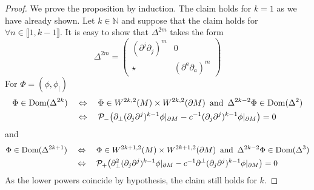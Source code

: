 \begin{proof}
We prove the proposition by induction.
The claim holds for $k =1$ as we have already shown. 
Let $k \in \mathbb{N}$ and suppose that the claim holds for $\forall n \in \llbracket 1, k-1 \rrbracket $. 
It is easy to show that $\Delta^{2m}$ takes the form
\begin{equation*}
 \Delta^{2m}  = 
\begin{pmatrix} (\partial^j\partial_j)^m & 0 \\
\star & (\partial^a \partial_a)^m\end{pmatrix}
\end{equation*}
For $\Phi = (\phi, \phi_|)$
\begin{equation*}
\begin{split}
\Phi \in \mathrm{Dom}(\Delta^{2k}) \quad &\Leftrightarrow \quad
\Phi \in W^{2k,2}(M)\times W^{2k,2}(\partial M) \enskip \mathrm{and}\enskip \Delta^{2k-2}\Phi \in \mathrm{Dom}(\Delta^{2}) \\
&\Leftrightarrow \quad 
\mathcal{P}_{-}\big(\partial_\bot(\partial_j\partial^j)^{k-1}\phi\vert_{\partial M} - c^{-1}(\partial_j\partial^j)^{k-1}\phi\vert_{\partial M} \big) = 0
\end{split}
\end{equation*}
and
\begin{equation*}
\begin{split}
\Phi \in \mathrm{Dom}(\Delta^{2k+1}) \quad &\Leftrightarrow \quad
\Phi \in W^{2k+1,2}(M)\times W^{2k+1,2}(\partial M) \enskip \mathrm{and}\enskip \Delta^{2k-2}\Phi \in \mathrm{Dom}(\Delta^{3}) \\
&\Leftrightarrow \quad 
\mathcal{P}_{+}\big(\partial_\bot^2(\partial_j\partial^j)^{k-1}\phi\vert_{\partial M} - c^{-1}\partial^\bot(\partial_j\partial^j)^{k-1}\phi\vert_{\partial M} \big) = 0
\end{split}
\end{equation*}
As the lower powers coincide by hypothesis, 
the claim still holds for $k$.
\end{proof}

